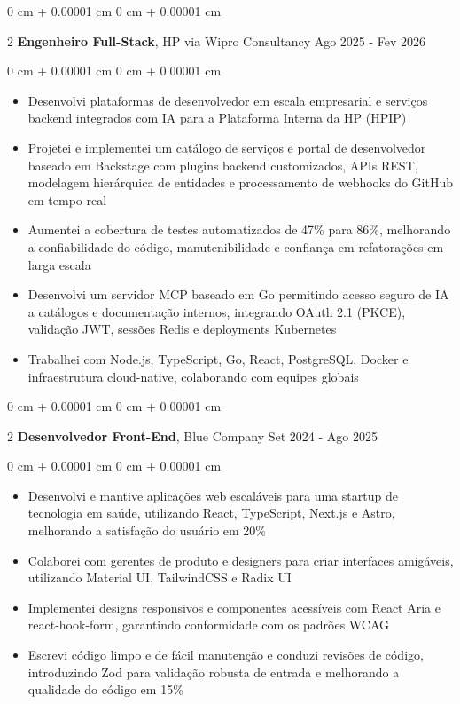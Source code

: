 \documentclass[10pt, letterpaper]{article}
\newenvironment{highlights}{ \begin{itemize}[ topsep=0.10 cm, parsep=0.10 cm, partopsep=0pt,
itemsep=0pt, leftmargin=0 cm + 10pt ] }{ \end{itemize} } %
\newenvironment{onecolentry}{ \begin{adjustwidth}{ 0 cm + 0.00001 cm }{ 0 cm + 0.00001 cm }
}{ \end{adjustwidth} } %
\newenvironment{twocolentry}[2][]{ \onecolentry \def\secondColumn{#2} \setcolumnwidth{\fill, 4.5 cm}
\begin{paracol}{2} }{ \switchcolumn \raggedleft \secondColumn \end{paracol}
\endonecolentry } %
\begin{document}
	\vspace{0.2 cm}

	\begin{twocolentry}
		{ Ago 2025 - Fev 2026 } \textbf{Engenheiro Full-Stack}, HP via Wipro Consultancy
	\end{twocolentry}

	\vspace{0.10 cm}
	\begin{onecolentry}
		\begin{highlights}
			\item Desenvolvi plataformas de desenvolvedor em escala empresarial e serviços backend integrados com IA para a Plataforma Interna da HP (HPIP)
			\item Projetei e implementei um catálogo de serviços e portal de desenvolvedor baseado em Backstage com plugins backend customizados, APIs REST, modelagem hierárquica de entidades e processamento de webhooks do GitHub em tempo real
			\item Aumentei a cobertura de testes automatizados de 47\% para 86\%, melhorando a confiabilidade do código, manutenibilidade e confiança em refatorações em larga escala
			\item Desenvolvi um servidor MCP baseado em Go permitindo acesso seguro de IA a catálogos e documentação internos, integrando OAuth 2.1 (PKCE), validação JWT, sessões Redis e deployments Kubernetes
			\item Trabalhei com Node.js, TypeScript, Go, React, PostgreSQL, Docker e infraestrutura cloud-native, colaborando com equipes globais
		\end{highlights}
	\end{onecolentry}

	\vspace{0.2 cm}

	\begin{twocolentry}
		{ Set 2024 - Ago 2025 } \textbf{Desenvolvedor Front-End}, Blue Company
	\end{twocolentry}

	\vspace{0.10 cm}
	\begin{onecolentry}
		\begin{highlights}
			\item Desenvolvi e mantive aplicações web escaláveis para uma startup de tecnologia em saúde, utilizando React, TypeScript, Next.js e Astro, melhorando a satisfação do usuário em 20\%
			\item Colaborei com gerentes de produto e designers para criar interfaces amigáveis, utilizando Material UI, TailwindCSS e Radix UI
			\item Implementei designs responsivos e componentes acessíveis com React Aria e react-hook-form, garantindo conformidade com os padrões WCAG
			\item Escrevi código limpo e de fácil manutenção e conduzi revisões de código, introduzindo Zod para validação robusta de entrada e melhorando a qualidade do código em 15\%
		\end{highlights}
	\end{onecolentry}
\end{document}
